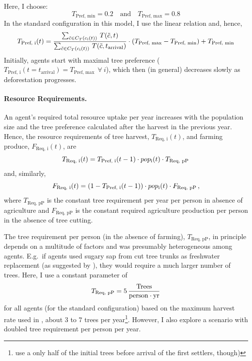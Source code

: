 Here, I choose: 
\begin{equation}
T_\text{Pref, min} = 0.2 \quad \text{and} \quad T_\text{Pref, max} = 0.8
\end{equation} 
In the standard configuration in this model, I use the linear relation and, hence, 
\begin{equation}
	T_\text{Pref, i}(t) =  \frac{\sum_{\tilde{c} \in C_{T}(c_{\rm i}(t)) } \, T(\tilde{c}, t)}{\sum_{\tilde{c} \in C_{T}(c_{\rm i}(t))} \, T(\tilde{c}, t_\text{arrival}) } \cdot (T_\text{Pref, max}-T_\text{Pref, min}) + T_\text{Pref, min}
\end{equation}
Initially, agents start with maximal tree preference ($T_\text{Pref, i}(t=t_\text{arrival}) = T_\text{Pref, max} \ \  \forall \ i$), which then (in general) decreases slowly as deforestation progresses.

\paragraph{Resource Requirements.}
An agent's required total resource uptake per year increases with the population size and the tree preference calculated after the harvest in the previous year.
Hence, the resource requirements of tree harvest, $T_\text{Req, i}(t)$, and farming produce, $F_\text{Req, i}(t)$, are 
\begin{equation}
T_\text{Req, i}(t) = T_\text{Pref, i}(t-1) \cdot pop_{\rm i}(t) \cdot T_\text{Req, pP} \, 
\end{equation}
and, similarly, 
\begin{equation}
F_\text{Req, i}(t) = (1-T_\text{Pref, i}(t-1)) \cdot pop_{\rm i}(t) \cdot F_\text{Req, pP}\, , 
\end{equation}
where $T_\text{Req, pP}$ is the constant tree requirement per year per person in absence of agriculture and $F_\text{Req, pP}$ is the constant required agriculture production per person in the absence of tree cutting.

The tree requirement per person (in the absence of farming), $T_\text{Req, pP}$, in principle depends on a multitude of factors and was presumably heterogeneous among agents.
E.g.\ if agents used sugary sap from cut tree trunks as freshwater replacement (as suggested by ), they would require a much larger number of trees.
Here, I use a constant parameter of 
\begin{equation}
T_\text{Req, pP} = 5\, \frac{\text{Trees}}{\rm person\cdot yr}
\end{equation}
for all agents (for the standard configuration) based on the maximum harvest rate used in \citet{Brandt2015}, about $3$ to $7$ trees per year\footnote{\citet{Brandt2015} use a only half of the initial trees before arrival of the first settlers, though)}. 
However, I also explore a scenario with doubled tree requirement per person per year.

